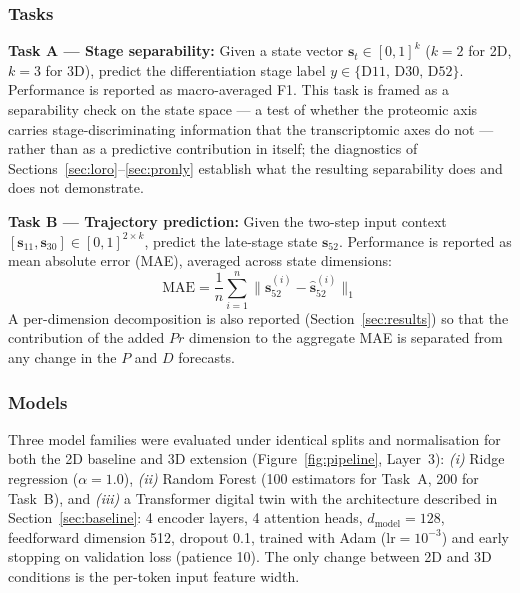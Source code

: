 \documentclass[5p,times,twocolumn]{elsarticle}
\begin{document}
\subsubsection{Tasks}

\textbf{Task A --- Stage separability:}
Given a state vector $\mathbf{s}_{t} \in [0,1]^{k}$
($k = 2$ for 2D, $k = 3$ for 3D), predict the differentiation
stage label $y \in \{\text{D11, D30, D52}\}$.
Performance is reported as macro-averaged F1.
This task is framed as a separability check on the state
space --- a test of whether the proteomic axis carries
stage-discriminating information that the transcriptomic
axes do not --- rather than as a predictive contribution in
itself; the diagnostics of
Sections~\ref{sec:loro}--\ref{sec:pronly} establish what the
resulting separability does and does not demonstrate.

\textbf{Task B --- Trajectory prediction:}
Given the two-step input context
$[\mathbf{s}_{11}, \mathbf{s}_{30}] \in [0,1]^{2 \times k}$,
predict the late-stage state $\mathbf{s}_{52}$.
Performance is reported as mean absolute error (MAE),
averaged across state dimensions:
%
\begin{equation}
  \text{MAE} =
    \frac{1}{n}
    \sum_{i=1}^{n}
    \bigl\lVert \mathbf{s}^{(i)}_{52} -
                \hat{\mathbf{s}}^{(i)}_{52} \bigr\rVert_{1}
  \label{eq:mae}
\end{equation}
%
A per-dimension decomposition is also reported
(Section~\ref{sec:results}) so that the contribution of the
added $Pr$ dimension to the aggregate MAE is separated from
any change in the $P$ and $D$ forecasts.

\subsubsection{Models}

Three model families were evaluated under identical splits
and normalisation for both the 2D baseline and 3D extension
(Figure~\ref{fig:pipeline}, Layer~3):
\textit{(i)} Ridge regression ($\alpha = 1.0$),
\textit{(ii)} Random Forest (100 estimators for Task~A,
200 for Task~B), and
\textit{(iii)} a Transformer digital twin with the
architecture described in Section~\ref{sec:baseline}:
4 encoder layers, 4 attention heads,
$d_{\text{model}} = 128$, feedforward dimension 512,
dropout 0.1, trained with Adam ($\text{lr} = 10^{-3}$)
and early stopping on validation loss (patience 10).
The only change between 2D and 3D conditions is the
per-token input feature width.
\end{document}
